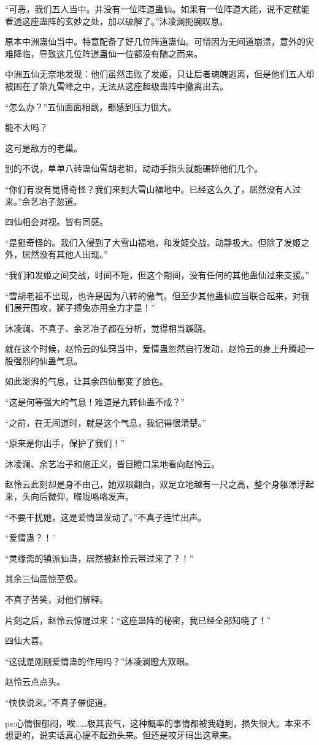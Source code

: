\begin{this_body}
“可恶，我们五人当中。并没有一位阵道蛊仙。如果有一位阵道大能，说不定就能看透这座蛊阵的玄妙之处，加以破解了。”沐凌澜扼腕叹息。

原本中洲蛊仙当中。特意配备了好几位阵道蛊仙。可惜因为无间道崩溃，意外的灾难降临，导致这几位阵道蛊仙一位都没有随之而来。

中洲五仙无奈地发现：他们虽然击败了发姬，只让后者魂魄逃离，但是他们五人却被困在了第九雪峰之中，无法从这座超级蛊阵中撤离出去。

“怎么办？”五仙面面相觑，都感到压力很大。

能不大吗？

这可是敌方的老巢。

别的不说，单单八转蛊仙雪胡老祖，动动手指头就能碾碎他们几个。

“你们有没有觉得奇怪？我们来到大雪山福地中。已经这么久了，居然没有人过来。”余艺冶子忽道。

四仙相会对视。皆有同感。

“是挺奇怪的。我们入侵到了大雪山福地，和发姬交战。动静极大。但除了发姬之外，居然没有其他人出现。”

“我们和发姬之间交战，时间不短，但这个期间，没有任何的其他蛊仙过来支援。”

“雪胡老祖不出现，也许是因为八转的傲气。但至少其他蛊仙应当联合起来，对我们展开围攻，狮子搏兔亦用全力才是！”

沐凌澜、不真子、余艺冶子都在分析，觉得相当蹊跷。

就在这个时候，赵怜云的仙窍当中，爱情蛊忽然自行发动，赵怜云的身上升腾起一股强烈的仙蛊气息。

如此澎湃的气息，让其余四仙都变了脸色。

“这是何等强大的气息！难道是九转仙蛊不成？”

“之前，在无间道时，就是这个气息，我记得很清楚。”

“原来是你出手，保护了我们！”

沐凌澜、余艺冶子和施正义，皆目瞪口呆地看向赵怜云。

赵怜云此刻却是身不由己，她双眼翻白，双足立地越有一尺之高，整个身躯漂浮起来，头向后微仰，喉咙咯咯发声。

“不要干扰她，这是爱情蛊发动了。”不真子连忙出声。

“爱情蛊？！”

“灵缘斋的镇派仙蛊，居然被赵怜云带过来了？！”

其余三仙震惊至极。

不真子苦笑，对他们解释。

片刻之后，赵怜云惊醒过来：“这座蛊阵的秘密，我已经全部知晓了！”

四仙大喜。

“这就是刚刚爱情蛊的作用吗？”沐凌澜瞪大双眼。

赵怜云点点头。

“快快说来。”不真子催促道。

ps:心情很郁闷，唉……极其丧气，这种概率的事情都被我碰到，损失很大。本来不想更的，说实话真心提不起劲头来。但还是咬牙码出这章来。

\end{this_body}

